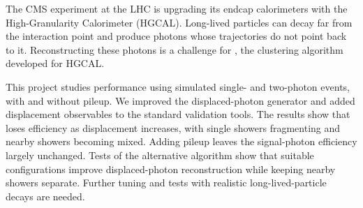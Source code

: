 The CMS experiment at the LHC is upgrading its endcap
calorimeters with the High-Granularity Calorimeter (HGCAL). Long-lived particles can decay far from the
interaction point and produce photons whose trajectories do not point back to
it. Reconstructing these photons is a challenge for \cluethreed{}, the
clustering algorithm developed for HGCAL.

This project studies \cluethreed{} performance using simulated single- and
two-photon events, with and without pileup. We improved the displaced-photon
generator and added displacement observables to the standard validation tools.
The results show that \cluethreed{} loses efficiency as displacement increases,
with single showers fragmenting and nearby showers becoming mixed. Adding pileup
leaves the signal-photon efficiency largely unchanged. Tests of the alternative
\cluestering{} algorithm show that suitable configurations improve
displaced-photon reconstruction while keeping nearby showers separate. Further
tuning and tests with realistic long-lived-particle decays are needed.
